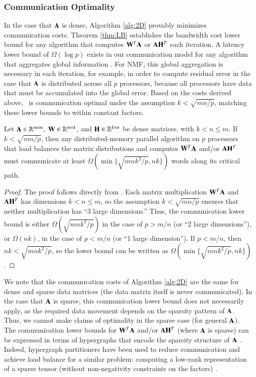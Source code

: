 \subsubsection{Communication Optimality}

In the case that $\AA$ is dense, Algorithm \ref{alg:2D} provably minimizes communication costs.
Theorem \ref{thm:LB} establishes the bandwidth cost lower bound for any algorithm that computes $\WW^T\AA$ or $\AA\HH^T$ each iteration.
A latency lower bound of $\Omega(\log p)$ exists in our communication model for any algorithm that aggregates global information \cite{CH+07}.
For NMF, this global aggregation is necessary in each iteration, for example, in order to compute residual error in the case that $\AA$ is distributed across all $p$ processors, because all processors have data that must be accumulated into the global error.
Based on the costs derived above, \ParNMF\ is communication optimal under the assumption $k<\sqrt{mn/p}$, matching these lower bounds to within constant factors.

\begin{theorem}[\cite{DE+13}]
\label{thm:LB}
Let $\AA \in \Rn{m \times n}$, $\WW \in \Rn{m \times k}$, and $\HH \in \Rn{k \times n}$ be dense matrices, with $k<n\leq m$.  If $k < \sqrt{mn/p}$, then any distributed-memory parallel algorithm on $p$ processors that load balances the matrix distributions and computes $\WW^T \AA$ and/or $\AA \HH^T$ must communicate at least $\Omega(\min\{\sqrt{mnk^2/p},nk\})$ words along its critical path.
\end{theorem}
\begin{proof}
The proof follows directly from \cite[Section II.B]{DE+13}.
Each matrix multiplication $\WW^T \AA$ and $\AA \HH^T$ has dimensions $k<n\leq m$, so the assumption $k<\sqrt{mn/p}$ ensures that neither multiplication has ``3 large dimensions.''
Thus, the communication lower bound is either $\Omega(\sqrt{mnk^2/p})$ in the case of $p>m/n$ (or ``2 large dimensions''), or $\Omega(nk)$, in the case of $p<m/n$ (or ``1 large dimension'').
If $p<m/n$, then $nk<\sqrt{mnk^2/p}$, so the lower bound can be written as $\Omega(\min\{\sqrt{mnk^2/p},nk\})$.
\end{proof}

We note that the communication costs of Algorithm \ref{alg:2D} are the same for dense and sparse data matrices (the data matrix itself is never communicated).
In the case that $\AA$ is sparse, this communication lower bound does not necessarily apply, as the required data movement depends on the sparsity pattern of $\AA$.
Thus, we cannot make claims of optimality in the sparse case (for general $\AA$).
The communication lower bounds for $\WW^T \AA$ and/or $\AA \HH^T$ (where $\AA$ is sparse) can be expressed in terms of hypergraphs that encode the sparsity structure of $\AA$ \cite{BDKS15}.
Indeed, hypergraph partitioners have been used to reduce communication and achieve load balance for a similar problem: computing a low-rank representation of a sparse tensor (without non-negativity constraints on the factors) \cite{KU15}.

